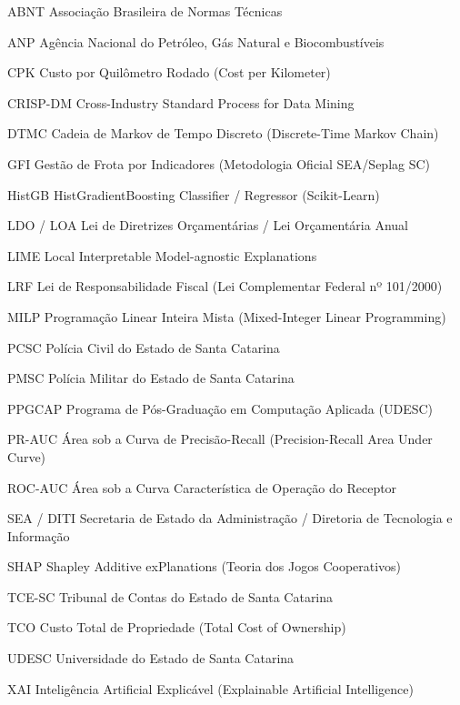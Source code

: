 \listoffigures*
\cleardoublepage

\listoftables*
\cleardoublepage

\begin{siglas}
    \item[ABNT] Associação Brasileira de Normas Técnicas
    \item[ANP] Agência Nacional do Petróleo, Gás Natural e Biocombustíveis
    \item[CPK] Custo por Quilômetro Rodado (Cost per Kilometer)
    \item[CRISP-DM] Cross-Industry Standard Process for Data Mining
    \item[DTMC] Cadeia de Markov de Tempo Discreto (Discrete-Time Markov Chain)
    \item[GFI] Gestão de Frota por Indicadores (Metodologia Oficial SEA/Seplag SC)
    \item[HistGB] HistGradientBoosting Classifier / Regressor (Scikit-Learn)
    \item[LDO / LOA] Lei de Diretrizes Orçamentárias / Lei Orçamentária Anual
    \item[LIME] Local Interpretable Model-agnostic Explanations
    \item[LRF] Lei de Responsabilidade Fiscal (Lei Complementar Federal nº 101/2000)
    \item[MILP] Programação Linear Inteira Mista (Mixed-Integer Linear Programming)
    \item[PCSC] Polícia Civil do Estado de Santa Catarina
    \item[PMSC] Polícia Militar do Estado de Santa Catarina
    \item[PPGCAP] Programa de Pós-Graduação em Computação Aplicada (UDESC)
    \item[PR-AUC] Área sob a Curva de Precisão-Recall (Precision-Recall Area Under Curve)
    \item[ROC-AUC] Área sob a Curva Característica de Operação do Receptor
    \item[SEA / DITI] Secretaria de Estado da Administração / Diretoria de Tecnologia e Informação
    \item[SHAP] Shapley Additive exPlanations (Teoria dos Jogos Cooperativos)
    \item[TCE-SC] Tribunal de Contas do Estado de Santa Catarina
    \item[TCO] Custo Total de Propriedade (Total Cost of Ownership)
    \item[UDESC] Universidade do Estado de Santa Catarina
    \item[XAI] Inteligência Artificial Explicável (Explainable Artificial Intelligence)
\end{siglas}
\cleardoublepage

